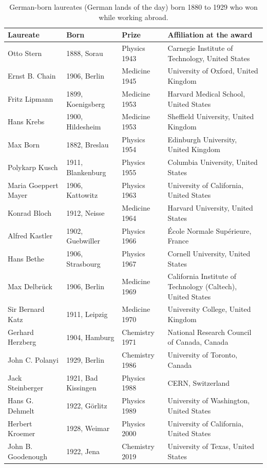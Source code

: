\documentclass[11pt,a4paper]{article}
\begin{document}
\begin{table}[tbp]\centering\small\caption{German-born laureates (German lands of the day) born 1880 to 1929 who won while working abroad.}\label{tab:germany}\begin{tabular}{lllp{5.4cm}}\toprule Laureate & Born & Prize & Affiliation at the award\\\midrule
Otto Stern & 1888, Sorau & Physics 1943 & Carnegie Institute of Technology, United States\\
Ernst B. Chain & 1906, Berlin & Medicine 1945 & University of Oxford, United Kingdom\\
Fritz Lipmann & 1899, Koenigsberg & Medicine 1953 & Harvard Medical School, United States\\
Hans Krebs & 1900, Hildesheim & Medicine 1953 & Sheffield University, United Kingdom\\
Max Born & 1882, Breslau & Physics 1954 & Edinburgh University, United Kingdom\\
Polykarp Kusch & 1911, Blankenburg & Physics 1955 & Columbia University, United States\\
Maria Goeppert Mayer & 1906, Kattowitz & Physics 1963 & University of California, United States\\
Konrad Bloch & 1912, Neisse & Medicine 1964 & Harvard University, United States\\
Alfred Kastler & 1902, Guebwiller & Physics 1966 & École Normale Supérieure, France\\
Hans Bethe & 1906, Strasbourg & Physics 1967 & Cornell University, United States\\
Max Delbrück & 1906, Berlin & Medicine 1969 & California Institute of Technology (Caltech), United States\\
Sir Bernard Katz & 1911, Leipzig & Medicine 1970 & University College, United Kingdom\\
Gerhard Herzberg & 1904, Hamburg & Chemistry 1971 & National Research Council of Canada, Canada\\
John C. Polanyi & 1929, Berlin & Chemistry 1986 & University of Toronto, Canada\\
Jack Steinberger & 1921, Bad Kissingen & Physics 1988 & CERN, Switzerland\\
Hans G. Dehmelt & 1922, Görlitz & Physics 1989 & University of Washington, United States\\
Herbert Kroemer & 1928, Weimar & Physics 2000 & University of California, United States\\
John B. Goodenough & 1922, Jena & Chemistry 2019 & University of Texas, United States\\
\bottomrule\end{tabular}\end{table}
\end{document}
